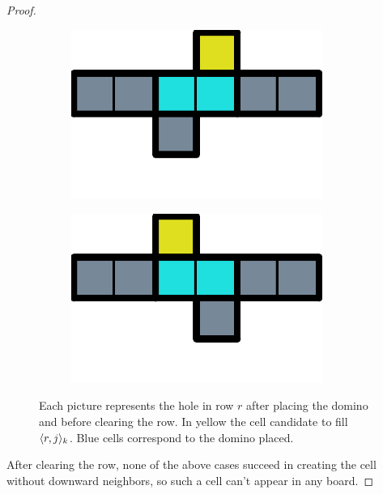 \begin{proof}
\begin{figure}[ht]
\begin{subfigure}[b]{0.15\textwidth}
    \caption{}
    \label{floating:e}
  \end{subfigure}
  \linebreak
  \begin{subfigure}[b]{0.15\textwidth}
    \centering
    \includegraphics[width=0.9\textwidth]{./pictures/dominoes/proff-floating/scenario-6.pdf}
    \caption{}
    \label{floating:f}
  \end{subfigure}
  \begin{subfigure}[b]{0.15\textwidth}
    \centering
    \includegraphics[width=0.9\textwidth]{./pictures/dominoes/proff-floating/scenario-7.pdf}
    \caption{}
    \label{floating:g}
  \end{subfigure}
  \caption{Each picture represents the hole in row $r$ after placing the domino and before clearing the row. In yellow the cell candidate to fill $\cell[r]_k$. Blue cells correspond to the domino placed.}
\end{figure}

After clearing the row, none of the above cases succeed in creating the cell without downward neighbors, so such a cell can't appear in any board.
\end{proof}

